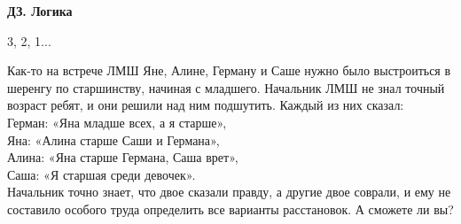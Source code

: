 \centerline{\bf \Huge ДЗ. Логика}
\centerline{\bf \Huge }


\begin{flushright}
        \scriptsize{3, 2, 1...}
\end{flushright}

 Как-то на встрече ЛМШ Яне, Алине, Герману и Саше нужно было выстроиться в шеренгу по старшинству, начиная с младшего. Начальник ЛМШ не знал точный возраст ребят, и они решили над ним подшутить.
Каждый из них сказал:\\
Герман: «Яна младше всех, а я старше»,\\
Яна: «Алина старше Саши и Германа»,\\
Алина: «Яна старше Германа, Саша врет»,\\
Саша: «Я старшая среди девочек».\\
Начальник точно знает, что двое сказали правду, а другие двое соврали, и ему не составило особого труда определить все варианты расстановок. А сможете ли вы?

